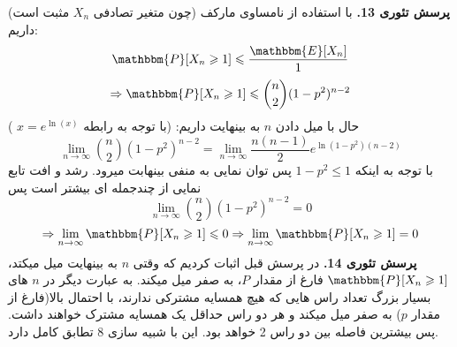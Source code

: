\documentclass[11pt]{article}
\begin{document}
\begin{persian}
\textbf{پرسش تئوری 13.}
با استفاده از نامساوی مارکف (چون متغیر تصادفی $X_n$ مثبت است) داریم:
$$
\mathbbm{P}[X_n \geqslant 1] \leqslant \frac{\mathbbm{E}[X_n]}{1} 
$$
$$
\Rightarrow \mathbbm{P}[X_n \geqslant 1] \leqslant {n \choose 2}(1-p^2)^{n-2}
$$
حال با میل دادن $n$ به بینهایت داریم:
(با توجه به رابطه
$x = e^{\ln(x)}$
)
$$
\lim_{n \to \infty}  {n \choose 2}(1-p^2)^{n-2} = \lim_{n \to \infty}   \frac{n(n-1)}{2} e^{\ln(1-p^2)(n-2)}
$$
با توجه به اینکه 
$1-p^2 \leqslant 1$
پس توان نمایی به منفی بینهابت میرود. رشد و افت تابع نمایی از چندجمله ای بیشتر است پس 
$$
\lim_{n \to \infty}  {n \choose 2}(1-p^2)^{n-2}  = 0
$$
$$
\Rightarrow \lim_{n \to \infty} \mathbbm{P}[X_n \geqslant 1] \leqslant 0 \Rightarrow  \lim_{n \to \infty} \mathbbm{P}[X_n \geqslant 1] = 0
$$
\textbf{پرسش تئوری 14.}
در پرسش قبل اثبات کردیم که وقتی $n$ به بینهایت میل میکتد،
$\mathbbm{P}[X_n \geqslant 1]$
فارغ از مقدار $P$، به صفر میل میکند. به عبارت دیگر در $n$  های بسیار بزرگ تعداد راس هایی که هیچ همسایه مشترکی ندارند، با احتمال بالا(فارغ از مقدار $p$) به صفر میل میکند و هر دو راس حداقل یک همسایه مشترک خواهند داشت. پس بیشترین فاصله بین دو راس 2 خواهد بود. این با شبیه سازی 8 تطابق کامل دارد.

\end{persian}
\end{document}
